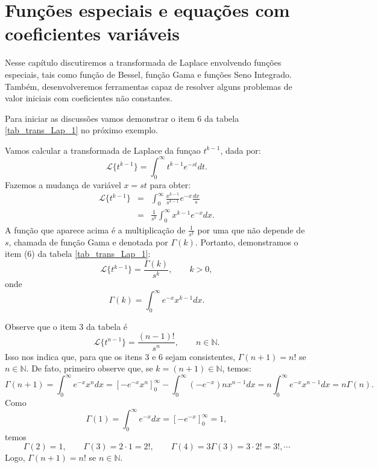 \documentclass[Main.tex]{subfiles}
\begin{document}
\chapter{Funções especiais e equações com coeficientes variáveis}

Nesse capítulo discutiremos a transformada de Laplace envolvendo funções especiais, tais como função de Bessel, função Gama e funções Seno Integrado. Também, desenvolveremos ferramentas capaz de resolver alguns problemas de valor iniciais com coeficientes não constantes.

Para iniciar as discussões vamos demonstrar o item 6 da tabela \ref{tab_trans_Lap_1} no próximo exemplo.

\begin{ex}Vamos calcular a transformada de Laplace da funçao $t^{k-1}$, dada por:
$$
\mathcal{L}\{t^{k-1} \}=\int_0^\infty t^{k-1} e^{-st}dt.
$$
Fazemos a mudança de variável $x=st$ para obter:
\begin{eqnarray*}
 \mathcal{L}\{t^{k-1} \}&=&\int_0^\infty \frac{x^{k-1}}{s^{k-1}}e^{-x}\frac{dx}{s}\\
 &=&\frac{1}{s^k}\int_0^\infty x^{k-1}e^{-x} dx.
 \end{eqnarray*}
A função que aparece acima é a multiplicação de $\frac{1}{s^k}$ por uma que não depende de $s$, chamada de função Gama e denotada por $\Gamma(k)$. Portanto, demonstramos o item (6) da tabela \ref{tab_trans_Lap_1}:
$$
\mathcal{L}\{t^{k-1} \}=\frac{\Gamma(k)}{s^k},\qquad k>0,
$$
onde
$$
\Gamma(k)=\int_0^\infty e^{-x}x^{k-1}dx.
$$
\end{ex}
Observe que o item 3 da tabela é
$$
\mathcal{L}\{t^{n-1}\}=\frac{(n-1)!}{s^n}, \qquad n\in \mathbb{N}.
$$
Isso nos indica que, para que os itens 3 e 6 sejam consistentes, $\Gamma(n+1)=n!$ se $n\in\mathbb{N}$. De fato, primeiro observe que, se $k=(n+1)\in\mathbb{N}$, temos:
$$
\Gamma(n+1)=\int_0^\infty e^{-x}x^{n}dx=\left[-e^{-x}x^{n}\right]_0^\infty-\int_0^\infty (-e^{-x})nx^{n-1}dx=n\int_0^\infty e^{-x}x^{n-1}dx=n\Gamma(n).
$$
Como 
$$
\Gamma(1)=\int_0^\infty e^{-x}dx=\left[-e^{-x}\right]_0^\infty=1,
$$
temos
$$
\Gamma(2)=1,\qquad \Gamma(3)=2\cdot 1=2!,\qquad \Gamma(4)=3\Gamma(3)=3\cdot 2!=3!,\cdots
$$
Logo, $\Gamma(n+1)=n!$ se $n\in\mathbb{N}$.
\end{document}
